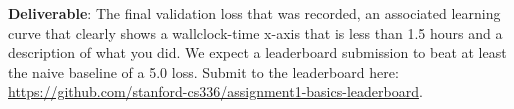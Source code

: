 \textbf{Deliverable}: The final validation loss that was recorded, an associated learning curve that clearly shows a wallclock-time x-axis that is less than 1.5 hours and a description of what you did. We expect a leaderboard submission to beat at least the naive baseline of a 5.0 loss. Submit to the leaderboard here: \url{https://github.com/stanford-cs336/assignment1-basics-leaderboard}.

\begin{answer}

\end{answer}

